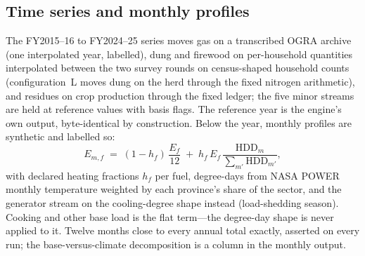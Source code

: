 \subsection{Time series and monthly profiles}

The FY2015--16 to FY2024--25 series moves gas on a transcribed OGRA
archive \citep{ograarchive} (one interpolated year, labelled), dung and firewood on
per-household quantities interpolated
between the two survey rounds on census-shaped household counts (configuration~L moves
dung on the herd through the fixed nitrogen arithmetic), and residues on crop
production through the fixed ledger; the five minor streams are held at reference
values with basis flags. The reference year is the engine's own output, byte-identical
by construction. Below the year, monthly profiles are synthetic and labelled so:
\begin{equation}
E_{m,f} \;=\; (1 - h_f)\,\frac{E_f}{12} \;+\; h_f\,E_f\,
\frac{\mathrm{HDD}_m}{\sum_{m'} \mathrm{HDD}_{m'}},
\end{equation}
with declared heating fractions $h_f$ per fuel, degree-days from NASA POWER monthly
temperature \citep{nasapower} weighted by each province's share of the sector, and the
generator stream on the cooling-degree shape instead (load-shedding season). Cooking
and other base load is the flat term---the degree-day shape is never applied to it.
Twelve months close to every annual total exactly, asserted on every run; the
base-versus-climate decomposition is a column in the monthly output.

